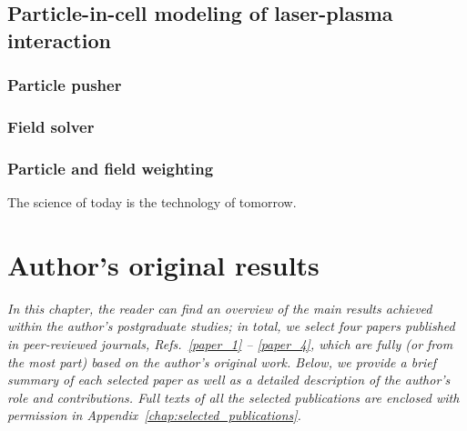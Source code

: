 \documentclass[10pt, a4paper, twoside, openright]{report}
\begin{document}

\section{Particle-in-cell modeling of laser-plasma interaction}
%

\subsection{Particle pusher}

\subsection{Field solver}

\subsection{Particle and field weighting}

%


\begin{savequote}[0.45\linewidth]
	\begin{fquote}
		 The science of today is the technology of tomorrow.
	\end{fquote}
\end{savequote}

\chapter{Author's original results\label{chap:authors_original_results}}
%

\textsl{In this chapter, the reader can find an overview of the main results achieved within the author's postgraduate studies; in total, we select four papers published in peer-reviewed journals, Refs.~\ref{paper_1} -- \ref{paper_4}, which are fully (or from the most part) based on the author's original work. Below, we provide a brief summary of each selected paper as well as a detailed description of the author's role and contributions. Full texts of all the selected publications are enclosed with permission in Appendix~\ref{chap:selected_publications}.}
\end{document}
